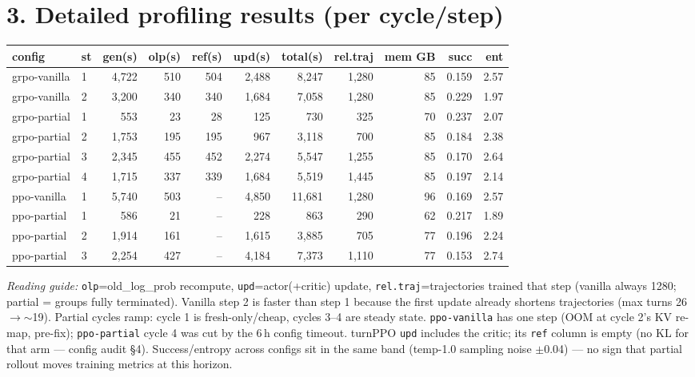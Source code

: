 \documentclass[10pt]{article}
\newcommand{\code}[1]{\texttt{\small #1}}
\begin{document}
\section*{3. Detailed profiling results (per cycle/step)}
\small
\begin{tabular}{llrrrrrrrrr}
\toprule
\textbf{config} & \textbf{st} & \textbf{gen(s)} & \textbf{olp(s)} & \textbf{ref(s)} & \textbf{upd(s)} & \textbf{total(s)} & \textbf{rel.traj} & \textbf{mem GB} & \textbf{succ} & \textbf{ent}\\
\midrule
grpo-vanilla & 1 & 4,722 & 510 & 504 & 2,488 & 8,247 & 1,280 & 85 & 0.159 & 2.57 \\
grpo-vanilla & 2 & 3,200 & 340 & 340 & 1,684 & 7,058 & 1,280 & 85 & 0.229 & 1.97 \\
grpo-partial & 1 & 553 & 23 & 28 & 125 & 730 & 325 & 70 & 0.237 & 2.07 \\
grpo-partial & 2 & 1,753 & 195 & 195 & 967 & 3,118 & 700 & 85 & 0.184 & 2.38 \\
grpo-partial & 3 & 2,345 & 455 & 452 & 2,274 & 5,547 & 1,255 & 85 & 0.170 & 2.64 \\
grpo-partial & 4 & 1,715 & 337 & 339 & 1,684 & 5,519 & 1,445 & 85 & 0.197 & 2.14 \\
ppo-vanilla & 1 & 5,740 & 503 & -- & 4,850 & 11,681 & 1,280 & 96 & 0.169 & 2.57 \\
ppo-partial & 1 & 586 & 21 & -- & 228 & 863 & 290 & 62 & 0.217 & 1.89 \\
ppo-partial & 2 & 1,914 & 161 & -- & 1,615 & 3,885 & 705 & 77 & 0.196 & 2.24 \\
ppo-partial & 3 & 2,254 & 427 & -- & 4,184 & 7,373 & 1,110 & 77 & 0.153 & 2.74 \\
\bottomrule
\end{tabular}

\vspace{0.35em}\noindent
\emph{Reading guide:} \code{olp}=old\_log\_prob recompute, \code{upd}=actor(+critic) update,
\code{rel.traj}=trajectories trained that step (vanilla always 1280; partial = groups fully
terminated). Vanilla step 2 is faster than step 1 because the first update already shortens
trajectories (max turns 26$\to$$\sim$19). Partial cycles ramp: cycle 1 is fresh-only/cheap,
cycles 3--4 are steady state. \code{ppo-vanilla} has one step (OOM at cycle 2's KV re-map,
pre-fix); \code{ppo-partial} cycle 4 was cut by the 6\,h config timeout. turnPPO \code{upd}
includes the critic; its \code{ref} column is empty (no KL for that arm --- config audit \S4).
Success/entropy across configs sit in the same band (temp-1.0 sampling noise $\pm$0.04) ---
no sign that partial rollout moves training metrics at this horizon.
\end{document}
